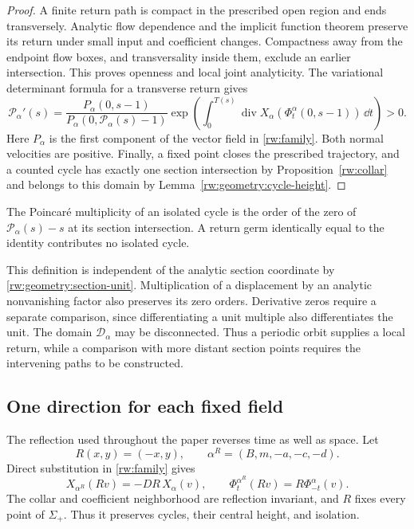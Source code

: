 \begin{proof}
A finite return path is compact in the prescribed open region and
ends transversely. Analytic flow dependence and the implicit function
theorem preserve its return under small input and coefficient changes.
Compactness away from the endpoint flow boxes, and transversality
inside them, exclude an earlier intersection. This proves openness
and local joint analyticity.
The variational determinant formula for a transverse return gives
\[
 \mathcal P_\alpha'(s)=
 \frac{P_\alpha(0,s-1)}
      {P_\alpha(0,\mathcal P_\alpha(s)-1)}
 \exp\!\left(\int_0^{T(s)}\operatorname{div}X_\alpha
                          (\Phi_t^\alpha(0,s-1))\,\dd t\right)>0.
\]
Here $P_\alpha$ is the first component of the vector field in
\eqref{rw:family}.
Both normal velocities are positive.  Finally, a fixed point closes
the prescribed trajectory, and a counted cycle has exactly one section
intersection by Proposition~\ref{rw:collar} and belongs to this domain
by Lemma~\ref{rw:geometry:cycle-height}.
\end{proof}

\begin{definition}\label{rw:geometry:counting}
The Poincar\'e multiplicity of an isolated cycle is the order of the
zero of $\mathcal P_\alpha(s)-s$ at its section intersection.  A return germ
identically equal to the identity contributes no isolated cycle.
\end{definition}

This definition is independent of the analytic section coordinate by
\eqref{rw:geometry:section-unit}.  Multiplication of a displacement by
an analytic nonvanishing factor also preserves its zero orders.
Derivative zeros require a separate comparison, since differentiating
a unit multiple also differentiates the unit.  The domain
$\mathcal D_\alpha$ may be disconnected.  Thus a periodic orbit
supplies a local return, while a comparison with more distant section
points requires the intervening paths to be constructed.

\subsection{One direction for each fixed field}

The reflection used throughout the paper reverses time as well as space.
Let
\begin{equation}\label{rw:geometry:reflection}
 R(x,y)=(-x,y),\qquad
 \alpha^R=(B,m,-a,-c,-d).
\end{equation}
Direct substitution in \eqref{rw:family} gives
\begin{equation}\label{rw:geometry:flow-reflection}
 X_{\alpha^R}(R v)=-DR\,X_\alpha(v),\qquad
 \Phi_t^{\alpha^R}(Rv)=R\Phi_{-t}^{\alpha}(v).
\end{equation}
The collar and coefficient neighborhood are reflection invariant, and
$R$ fixes every point of $\Sigma_+$.  Thus it preserves cycles, their
central height, and isolation.

